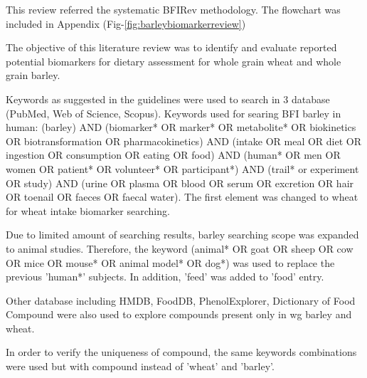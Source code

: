 This review referred the systematic BFIRev methodology\cite{Pratico2018}. The flowchart was included in Appendix (Fig-\ref{fig:barleybiomarkerreview})

The objective of this literature review was to identify and evaluate reported potential biomarkers for dietary assessment for whole grain wheat and whole grain barley.

Keywords as suggested in the guidelines\cite{Pratico2018} were used to search in 3 database (PubMed, Web of Science, Scopus). Keywords used for searing BFI barley in human: 
(barley) AND (biomarker* OR marker* OR metabolite* OR biokinetics OR biotransformation OR pharmacokinetics) AND (intake OR meal OR diet OR ingestion OR consumption OR eating OR food) AND 
(human* OR men OR women OR patient* OR volunteer* OR participant*) AND 
(trail* or experiment OR study) AND (urine OR plasma OR blood OR serum OR excretion OR hair OR toenail OR faeces OR faecal water). The first element was changed to wheat for wheat intake biomarker searching. 

Due to limited amount of searching results, barley searching scope was expanded to animal studies. Therefore, the keyword (animal* OR goat OR sheep OR cow OR mice OR mouse* OR animal model* OR dog*) was used to replace the previous 'human*' subjects. In addition, 'feed' was added to 'food' entry.

Other database including HMDB\cite{hmdb}, FoodDB\cite{foodb}, PhenolExplorer\cite{phenolexplorer}, Dictionary of Food Compound\cite{dictionary} were also used to explore compounds present only in \acrshort{wg} barley and wheat. 

In order to verify the uniqueness of compound, the same keywords combinations were used but with compound instead of 'wheat' and 'barley'.